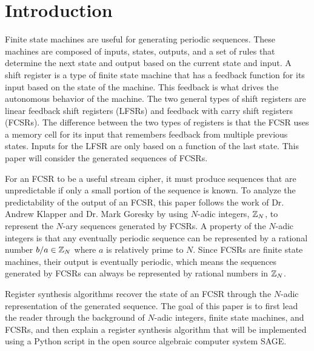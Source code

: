 \section{Introduction}
\par Finite state machines are useful for generating
periodic sequences. These machines are composed of
inputs, states, outputs, and a set of rules that
determine the next state and output based on the current state and input.
A shift register is a type of finite state machine that
has a feedback function for its input based on the state
of the machine. This feedback is what drives the autonomous
behavior of the machine. The two general types of shift
registers are linear feedback shift registers (LFSRs) and
feedback with carry shift registers (FCSRs). The difference
between the two types of registers is that the FCSR uses
a memory cell for its input that remembers feedback from multiple
previous states. Inputs for the LFSR are only based on a
function of the last state. This paper will consider
the generated sequences of FCSRs.

\par For an FCSR to be a useful stream cipher, it must
produce sequences that are unpredictable if only a small
portion of the sequence is known. To analyze the
predictability of the output of an FCSR, this paper follows
the work of Dr. Andrew Klapper and Dr. Mark Goresky by using
$N$-adic integers, $\mathbb{Z}_N$, to represent the $N$-ary sequences
generated by FCSRs. A property of the $N$-adic integers
is that any eventually periodic sequence can be represented
by a rational number $b/a\in\mathbb{Z}_N$ where $a$ is
relatively prime to $N$. Since FCSRs are finite state
machines, their output is eventually periodic, which means
the sequences generated by FCSRs can always be represented
by rational numbers in $\mathbb{Z}_N$.

\par Register synthesis algorithms recover the state of an FCSR
through the $N$-adic representation of the generated sequence.
The goal of this paper is to first lead the reader through
the background of $N$-adic integers, finite state machines, and FCSRs, and then
explain a register synthesis algorithm that will be
implemented using a Python script in the open source
algebraic computer system SAGE.

